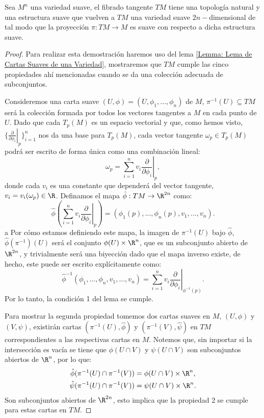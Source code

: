 \begin{theorem}\label{Teorema: Estructura de Variedad del Fibrado Tangente}
	Sea $M^n$ una variedad suave, el fibrado tangente $TM$ tiene una topología natural y una estructura suave que vuelven a $TM$ una variedad suave $2n-$dimensional de tal modo que la proyección $\pi: TM \to M$ es suave con respecto a dicha estructura suave.
\end{theorem}

\begin{proof}
	Para realizar esta demostración haremos uso del lema \ref{Lemma: Lema de Cartas Suaves de una Variedad}, mostraremos que $TM$ cumple las cinco propiedades ahí mencionadas cuando se da una colección adecuada de subconjuntos.

	Consideremos una carta suave $(U,\phi)=(U,\phi_1,\dots,\phi_n)$ de $M$, $\pi^{-1}(U) \subseteq TM$ será la colección formada por todos los vectores tangentes a $M$ en cada punto de $U$. Dado que cada $T_p(M)$ es un espacio vectorial y que, como hemos visto, $\{\left. \frac{\partial}{\partial \phi_{i}} \right|_{p}\}_{i=1}^{n}$ nos da una base para $T_p(M)$, cada vector tangente $\omega_p \in T_p(M)$ podrá ser escrito de forma única como una combinación lineal:
	\[
		\omega_p = \sum_{i=1}^{n} v_i \left. \frac{\partial}{\partial \phi_{i}}\right|_{p},
	\]
	donde cada $v_i$ es una constante que dependerá del vector tangente, $v_i = v_i(\omega_p) \in \R$. Definamos el mapa $\hat{\phi}: TM \to \R^{2n}$ como:
	\[
		\hat{\phi} \left(\sum_{i=1}^{n} v_i
		\left. \frac{\partial}{\partial \phi_{i}}\right|_{p} \right)
		=
		\left(\phi_1(p), \dots, \phi_n(p), v_1, \dots, v_n \right).
	\]
	a
	Por cómo estamos definiendo este mapa, la imagen de $\pi^{-1}(U)$ bajo $\hat{\phi}$, $\hat{\phi}(\pi^{-1})(U)$ será el conjunto $\phi(U) \times \R^n$, que es un subconjunto abierto de $\R^{2n}$, y trivialmente será una biyección dado que el mapa inverso existe, de hecho, este puede ser escrito explícitamente como:
	\[
		\hat{\phi}^{-1}(\phi_{1},\dots, \phi_{n}, v_1, \dots, v_n)
		=
		\sum_{i=1}^{n} v_i \left. \frac{\partial}{\partial \phi_i} \right|_{\phi^{-1}(p)}.
	\]
	Por lo tanto, la condición 1 del lema se cumple.

	Para mostrar la segunda propiedad tomemos dos cartas suaves en $M$, $(U,\phi)$ y $(V,\psi)$, existirán cartas $(\pi^{-1}(U),\hat{\phi})$ y $(\pi^{-1}(V),\hat{\psi})$ en $TM$ correspondientes a las respectivas cartas en $M$. Notemos que, sin importar si la intersección es vacía se tiene que $\phi(U \cap V)$ y $\psi(U \cap V)$ son subconjuntos abiertos de $\R^n$, por lo que:
	\begin{align*}
		\hat{\phi}(\pi^{-1}(U) \cap \pi^{-1}(V)) & =
		\phi(U \cap V) \times \R^n,                  \\
		\hat{\psi}(\pi^{-1}(U) \cap \pi^{-1}(V)) & =
		\psi(U \cap V) \times \R^n.                  \\
	\end{align*}
	Son subconjuntos abiertos de $\R^{2n}$, esto implica que la propiedad 2 se cumple para estas cartas en $TM$.


\end{proof}
